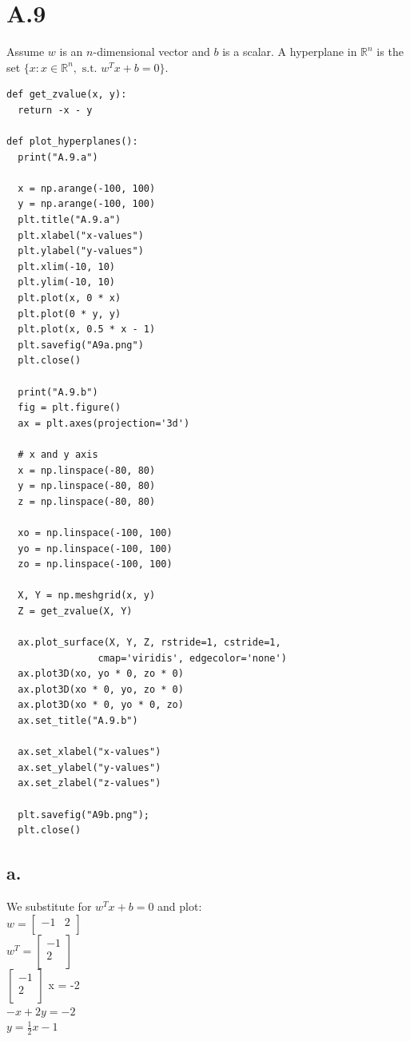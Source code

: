 \documentclass{article}
\newcommand{\field}[1]{\mathbb{#1}}
\newcommand{\1}{\mathbf{1}}
\newcommand{\R}{\field{R}} %
\begin{document}
\section*{A.9}
{\Large 

Assume $w$ is an $n$-dimensional vector and $b$ is a scalar. A hyperplane in $\R^n$ is the set $\{x : x\in \R^n,\text{ s.t. } w^T x + b = 0\}$.

\begin{verbatim}
def get_zvalue(x, y):
  return -x - y

def plot_hyperplanes():
  print("A.9.a")

  x = np.arange(-100, 100)
  y = np.arange(-100, 100)
  plt.title("A.9.a")
  plt.xlabel("x-values")
  plt.ylabel("y-values")
  plt.xlim(-10, 10)
  plt.ylim(-10, 10)
  plt.plot(x, 0 * x)
  plt.plot(0 * y, y)
  plt.plot(x, 0.5 * x - 1)
  plt.savefig("A9a.png")
  plt.close()

  print("A.9.b")
  fig = plt.figure()
  ax = plt.axes(projection='3d')

  # x and y axis
  x = np.linspace(-80, 80)
  y = np.linspace(-80, 80)
  z = np.linspace(-80, 80)

  xo = np.linspace(-100, 100)
  yo = np.linspace(-100, 100)
  zo = np.linspace(-100, 100)
  
  X, Y = np.meshgrid(x, y)
  Z = get_zvalue(X, Y)
  
  ax.plot_surface(X, Y, Z, rstride=1, cstride=1,
                cmap='viridis', edgecolor='none')
  ax.plot3D(xo, yo * 0, zo * 0)
  ax.plot3D(xo * 0, yo, zo * 0)
  ax.plot3D(xo * 0, yo * 0, zo)
  ax.set_title("A.9.b")
  
  ax.set_xlabel("x-values")
  ax.set_ylabel("y-values")
  ax.set_zlabel("z-values")
  
  plt.savefig("A9b.png");
  plt.close()
\end{verbatim}

\subsection*{a.}
We substitute for $w^T x + b = 0$ and plot: \\
$w = \begin{bmatrix} -1 & 2 \\ \end{bmatrix}$ \\
$w^T = \begin{bmatrix} -1 \\ 2 \\ \end{bmatrix}$ \\
$\begin{bmatrix} -1 \\ 2 \\ \end{bmatrix}$ x = -2 \\
$-x + 2y = -2$ \\
$y = \frac{1}{2}x -1$ \\ \\ \\ \\ \\ \\

}
\end{document}
